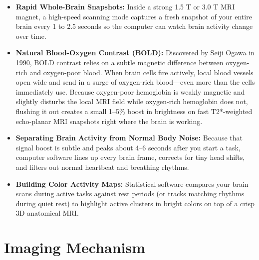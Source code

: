 \begin{itemize}
    \item \textbf{Rapid Whole-Brain Snapshots:} Inside a strong 1.5 T or 3.0 T MRI magnet, a high-speed scanning mode captures a fresh snapshot of your entire brain every 1 to 2.5 seconds so the computer can watch brain activity change over time.
    \item \textbf{Natural Blood-Oxygen Contrast (BOLD):} Discovered by Seiji Ogawa in 1990, BOLD contrast relies on a subtle magnetic difference between oxygen-rich and oxygen-poor blood. When brain cells fire actively, local blood vessels open wide and send in a surge of oxygen-rich blood---even more than the cells immediately use. Because oxygen-poor hemoglobin is weakly magnetic and slightly disturbs the local MRI field while oxygen-rich hemoglobin does not, flushing it out creates a small 1--5\% boost in brightness on fast T2*-weighted echo-planar MRI snapshots right where the brain is working.
    \item \textbf{Separating Brain Activity from Normal Body Noise:} Because that signal boost is subtle and peaks about 4--6 seconds after you start a task, computer software lines up every brain frame, corrects for tiny head shifts, and filters out normal heartbeat and breathing rhythms.
    \item \textbf{Building Color Activity Maps:} Statistical software compares your brain scans during active tasks against rest periods (or tracks matching rhythms during quiet rest) to highlight active clusters in bright colors on top of a crisp 3D anatomical MRI.
\end{itemize}

\section{Imaging Mechanism}

